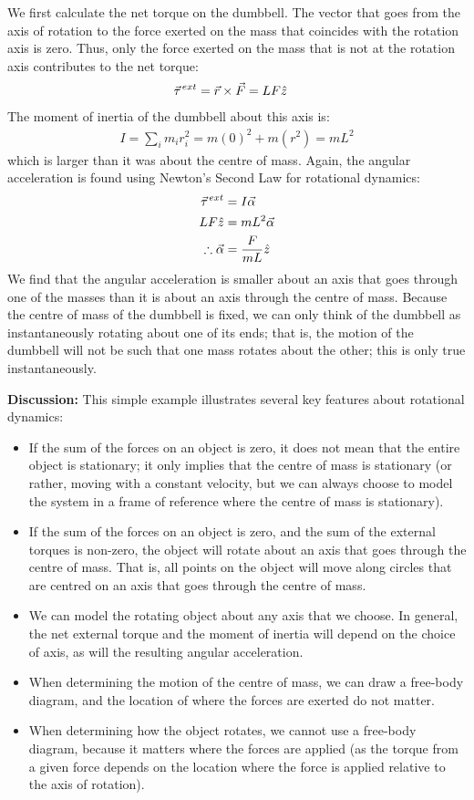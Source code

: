 \begin{example}
\begin{enumerate}[label=\alph*),topsep=-10pt]
We first calculate the net torque on the dumbbell. The vector that goes from the axis of rotation to the force exerted on the mass that coincides with the rotation axis is zero. Thus, only the force exerted on the mass that is not at the rotation axis contributes to the net torque:
\begin{align*}
\pvec\tau^{ext}&= \vec r \times \vec F = LF\hat z
\end{align*}
The moment of inertia of the dumbbell about this axis is:
\begin{align*}
I = \sum_i  m_ir_i^2 = m(0)^2 + m(r^2) = mL^2
\end{align*}
which is larger than it was about the centre of mass. Again, the angular acceleration is found using Newton's Second Law for rotational dynamics:
\begin{align*}
\pvec\tau^{ext}&= I\vec\alpha\\
LF\hat z&=mL^2\vec\alpha\\
\therefore \vec\alpha &= \frac{F}{mL}\hat z
\end{align*}
We find that the angular acceleration is smaller about an axis that goes through one of the masses than it is about an axis through the centre of mass. Because the centre of mass of the dumbbell is fixed, we can only think of the dumbbell as instantaneously rotating about one of its ends; that is, the motion of the dumbbell will not be such that one mass rotates about the other; this is only true instantaneously.
\end{enumerate}
\textbf{Discussion: }This simple example illustrates several key features about rotational dynamics:
\begin{itemize}
\item If the sum of the forces on an object is zero, it does not mean that the entire object is stationary; it only implies that the centre of mass is stationary (or rather, moving with a constant velocity, but we can always choose to model the system in a frame of reference where the centre of mass is stationary).
\item If the sum of the forces on an object is zero, and the sum of the external torques is non-zero, the object will rotate about an axis that goes through the centre of mass. That is, all points on the object will move along circles that are centred on an axis that goes through the centre of mass. 
\item We can model the rotating object about any axis that we choose. In general, the net external torque and the moment of inertia will depend on the choice of axis, as will the resulting angular acceleration. 
\item When determining the motion of the centre of mass, we can draw a free-body diagram, and the location of where the forces are exerted do not matter.
\item When determining how the object rotates, we cannot use a free-body diagram, because it matters where the forces are applied (as the torque from a given force depends on the location where the force is applied relative to the axis of rotation).
\end{itemize}
\end{example}

